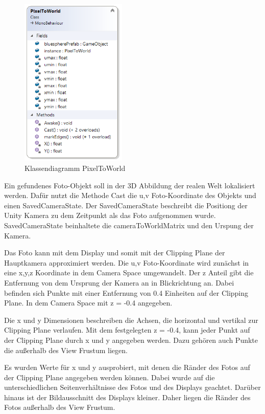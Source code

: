 \begin{figure}[H]
	\centering
	\includegraphics[width=0.45\textwidth]{images/dia_pixeltoworld.PNG}
	\caption[]{Klassendiagramm PixelToWorld}
	\label{dia:pixeltoworld}
\end{figure}

Ein gefundenes Foto-Objekt soll in der 3D Abbildung der realen Welt lokalisiert werden. Dafür nutzt die Methode Cast die u,v Foto-Koordinate des Objekts und einen SavedCameraState. Der SavedCameraState beschreibt die Positiong der Unity Kamera zu dem Zeitpunkt als das Foto aufgenommen wurde. SavedCameraState beinhaltete die cameraToWorldMatrix und den Urspung der Kamera.

Das Foto kann mit dem Display und somit mit der Clipping Plane der Hauptkamera approximiert werden.
Die u,v Foto-Koordinate wird zunächst in eine x,y,z Koordinate in dem Camera Space umgewandelt. Der z Anteil gibt die Entfernung von dem Ursprung der Kamera an in Blickrichtung an. Dabei befinden sich Punkte mit einer Entfernung von 0.4 Einheiten auf der Clipping Plane. In dem Camera Space mit z = -0.4 angegeben. 

Die x und y Dimensionen beschreiben die Achsen, die horizontal und vertikal zur Clipping Plane verlaufen. Mit dem festgelegten z = -0.4, kann jeder Punkt auf der Clipping Plane durch x und y angegeben werden. Dazu gehören auch Punkte die außerhalb des View Frustum liegen.

Es wurden Werte für x und y ausprobiert, mit denen die Ränder des Fotos auf der Clipping Plane angegeben werden können. Dabei wurde auf die unterschiedlichen Seitenverhältnisse des Fotos und des Displays geachtet. Darüber hinaus ist der Bildausschnitt des Displays kleiner. Daher liegen die Ränder des Fotos außerhalb des View Frustum. 

